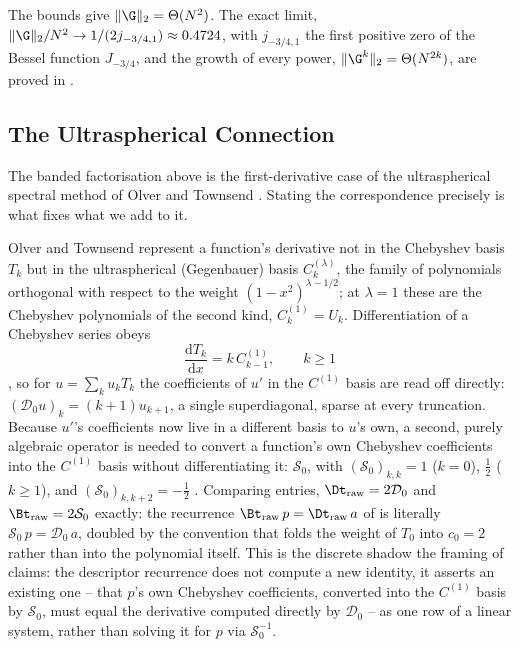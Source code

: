 The bounds give $\|\G\|_2=\Theta(N^2)$. The exact limit, $\|\G\|_2/N^2\to1/(2j_{-3/4,1})\approx0.4724$, with $j_{-3/4,1}$ the first positive zero of the Bessel function $J_{-3/4}$, and the growth of every power, $\|\G^k\|_2=\Theta(N^{2k})$, are proved in .

\subsection{The Ultraspherical Connection}
\label{app:ultraspherical}

The banded factorisation above is the first-derivative case of the
ultraspherical spectral method of Olver and Townsend \cite{olver2013}. Stating
the correspondence precisely is what fixes what we add to it.

Olver and Townsend represent a function's derivative not in the Chebyshev
basis $T_k$ but in the ultraspherical (Gegenbauer) basis $C_k^{(\lambda)}$,
the family of polynomials orthogonal with respect to the weight
$(1-x^2)^{\lambda - 1/2}$; at $\lambda = 1$ these are the Chebyshev
polynomials of the second kind, $C_k^{(1)} = U_k$. Differentiation of a
Chebyshev series obeys
\begin{equation}
    \frac{\mathrm{d}T_k}{\mathrm{d}x} = k\,C^{(1)}_{k-1} , \qquad k \ge 1
    \label{eq:app-ot-diff}
\end{equation}
\cite[Eq.~2.5]{olver2013}, so for $u = \sum_k u_k T_k$ the coefficients of
$u'$ in the $C^{(1)}$ basis are read off directly: $(\mathcal{D}_0 u)_k =
(k+1)u_{k+1}$, a single superdiagonal, sparse at every truncation. Because
$u'$'s coefficients now live in a different basis to $u$'s own, a second,
purely algebraic operator is needed to convert a function's own Chebyshev
coefficients into the $C^{(1)}$ basis without differentiating it:
$\mathcal{S}_0$, with $(\mathcal{S}_0)_{k,k} = 1$ ($k=0$), $\tfrac12$ ($k \ge
1$), and $(\mathcal{S}_0)_{k,k+2} = -\tfrac12$ \cite[Eq.~2.8]{olver2013}.
Comparing entries, $\Dt_\mathrm{raw} = 2\mathcal{D}_0$ and
$\Bt_\mathrm{raw} = 2\mathcal{S}_0$ exactly: the recurrence
$\Bt_\mathrm{raw}\,p = \Dt_\mathrm{raw}\,a$ of
 is literally $\mathcal{S}_0\,p = \mathcal{D}_0\,a$,
doubled by the convention that folds the weight of $T_0$ into $c_0 = 2$
rather than into the polynomial itself. This is the discrete shadow the
framing of  claims: the descriptor
recurrence does not compute a new identity, it asserts an existing one --
that $p$'s own Chebyshev coefficients, converted into the $C^{(1)}$ basis by
$\mathcal{S}_0$, must equal the derivative computed directly by
$\mathcal{D}_0$ -- as one row of a linear system, rather than solving it for
$p$ via $\mathcal{S}_0^{-1}$.

